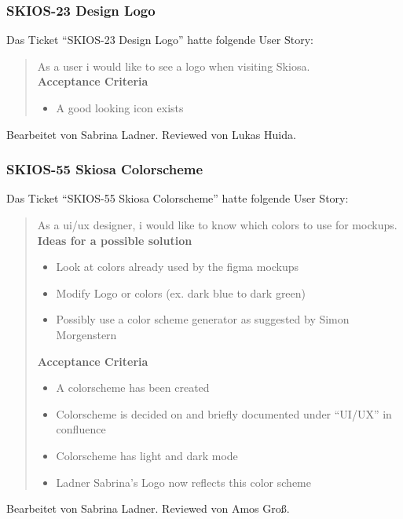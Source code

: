 \subsubsection{SKIOS-23 Design Logo}
Das Ticket \enquote{SKIOS-23 Design Logo} hatte folgende User Story:
\begin{quotation}
    As a user i would like to see a logo when visiting Skiosa. \\
    \textbf{Acceptance Criteria}
    \begin{itemize}
        \item A good looking icon exists
    \end{itemize}
\end{quotation}
Bearbeitet von Sabrina Ladner.
Reviewed von Lukas Huida.

\subsubsection{SKIOS-55 Skiosa Colorscheme}
Das Ticket \enquote{SKIOS-55 Skiosa Colorscheme} hatte folgende User Story:
\begin{quotation}
    As a ui/ux designer, i would like to know which colors to use for mockups. \\
    \textbf{Ideas for a possible solution}
    \begin{itemize}
    \item Look at colors already used by the figma mockups 
    \item Modify Logo or colors (ex. dark blue to dark green)
    \item Possibly use a color scheme generator as suggested by Simon Morgenstern
    \end{itemize}
    \textbf{Acceptance Criteria}
    \begin{itemize}
    \item A colorscheme has been created
    \item Colorscheme is decided on and briefly documented under “UI/UX” in confluence
    \item Colorscheme has light and dark mode
    \item Ladner Sabrina's Logo now reflects this color scheme
    \end{itemize}
\end{quotation}
Bearbeitet von Sabrina Ladner.
Reviewed von Amos Groß.

